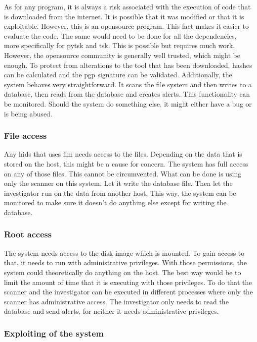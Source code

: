 As for any program, it is always a risk associated with the execution of code that is downloaded from the internet. It is possible that it was modified or that it is exploitable. However, this is an \gls{opensource} program. This fact makes it easier to evaluate the code. The same would need to be done for all the dependencies, more specifically for \gls{pytsk} and \gls{tsk}. This is possible but requires much work. However, the \gls{opensource} community is generally well trusted, which might be enough. To protect from alterations to the tool that has been downloaded, hashes can be calculated and the \gls{pgp} signature can be validated.
Additionally, the system behaves very straightforward. It scans the file system and then writes to a database, then reads from the database and creates alerts. This functionality can be monitored. Should the system do something else, it might either have a bug or is being abused.

\subsubsection{File access}
\label{sec:risk:file}

Any \gls{hids} that uses \gls{fim} needs access to the files. Depending on the data that is stored on the host, this might be a cause for concern. The system has full access on any of those files. This cannot be circumvented. What can be done is using only the scanner on this system. Let it write the database file. Then let the investigator run on the data from another host. This way, the system can be monitored to make sure it doesn't do anything else except for writing the database.

\subsubsection{Root access}
\label{sec:risk:root}

The system needs access to the disk image which is mounted. To gain access to that, it needs to run with administrative privileges. With those permissions, the system could theoretically do anything on the host. The best way would be to limit the amount of time that it is executing with those privileges. To do that the scanner and the investigator can be executed in different processes where only the scanner has administrative access. The investigator only needs to read the database and send alerts, for neither it needs administrative privileges.

\subsubsection{Exploiting of the system}
\label{sec:risk:exploiting}

